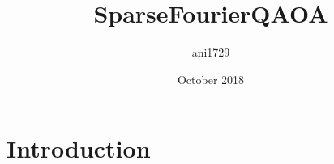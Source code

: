 \documentclass{article}
\title{SparseFourierQAOA}
\author{ani1729 }
\date{October 2018}
\begin{document}
\maketitle

\section{Introduction}
\end{document}
